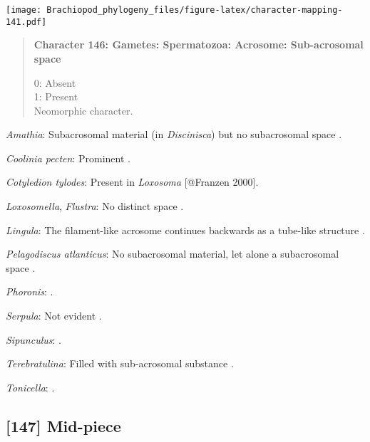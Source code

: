 \documentclass[openany]{book}
\theoremstyle{definition}
\theoremstyle{definition}
\theoremstyle{definition}
\theoremstyle{remark}
\begin{document}
\texttt{[image: Brachiopod\_phylogeny\_files/figure-latex/character-mapping-141.pdf]}

\begin{quote}
\textbf{Character 146: Gametes: Spermatozoa: Acrosome: Sub-acrosomal
space}

0: Absent\\
1: Present\\
Neomorphic character.
\end{quote}

\hypertarget{Amathia-coding-146}{}
\emph{Amathia}: Subacrosomal material (in \emph{Discinisca}) but no
subacrosomal space \citep{Hodgson1994Ultrastructureof}.

\hypertarget{Coolinia_pecten-coding-146}{}
\emph{Coolinia pecten}: Prominent \citep{Afzelius1978Finestructure}.

\hypertarget{Cotyledion_tylodes-coding-146}{}
\emph{Cotyledion tylodes}: Present in \emph{Loxosoma} {[}@Franzen
2000{]}.

\hypertarget{Flustra-coding-146}{}
\emph{Loxosomella}, \emph{Flustra}: No distinct space \citep[in
\emph{Tubulipora};][]{Franzen1984}.

\hypertarget{Lingula-coding-146}{}
\emph{Lingula}: The filament-like acrosome continues backwards as a
tube-like structure \citep[summarized in
\citet{Jamieson1991FishEvolution}]{Franzen1980Ultrastructureof}.

\hypertarget{Pelagodiscus_atlanticus-coding-146}{}
\emph{Pelagodiscus atlanticus}: No subacrosomal material, let alone a
subacrosomal space \citep[e.g.][]{Hodgson1994Ultrastructureof}.

\hypertarget{Phoronis-coding-146}{}
\emph{Phoronis}: \citet{Rice1993}.

\hypertarget{Serpula-coding-146}{}
\emph{Serpula}: Not evident \citep{BucklandNicks1988}.

\hypertarget{Sipunculus-coding-146}{}
\emph{Sipunculus}: \citet{Gherardi2011}.

\hypertarget{Terebratulina-coding-146}{}
\emph{Terebratulina}: Filled with sub-acrosomal substance
\citep{Fukumoto2003Theacrosome}.

\hypertarget{Tonicella-coding-146}{}
\emph{Tonicella}: \citet{DufresneDube1983}.

\subsection*{{[}147{]} Mid-piece}\label{mid-piece}
\end{document}
